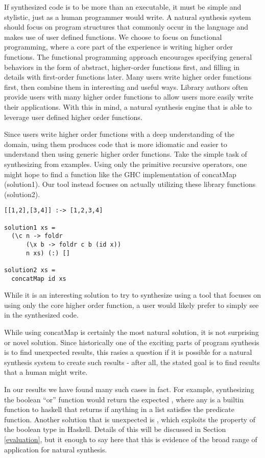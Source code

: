 If synthesized code is to be more than an executable, it must be
simple and stylistic, just as a human programmer would write.  A
natural synthesis system should focus on program structures that
commonly occur in the language and makes use of user defined
functions.  We choose to focus on functional programming, where a core
part of the experience is writing higher order functions.  The
functional programming approach encourages specifying general
behaviors in the form of abstract, higher-order functions first, and
filling in details with first-order functions later.  Many users write
higher order functions first, then combine them in interesting and
useful ways.  Library authors often provide users with many higher
order functions to allow users more easily write their applications.
With this in mind, a natural synthesis engine that is able to leverage
user defined higher order functions.

Since users write higher order functions with a deep understanding of
the domain, using them produces code that is more idiomatic and easier
to understand then using generic higher order functions.  Take the
simple task of synthesizing from examples. Using only the primitive
recursive operators, one might hope to find a function like the
GHC\cite{ghc} implementation of concatMap (solution1). Our tool
instead focuses on actually utilizing these library functions
(solution2).

\begin{lstlisting}
[[1,2],[3,4]] :-> [1,2,3,4]

solution1 xs = 
  (\c n -> foldr 
      (\x b -> foldr c b (id x))
      n xs) (:) []
      
solution2 xs =
  concatMap id xs
\end{lstlisting}
\noindent While it is an interesting solution to try to synthesize
using a tool that focuses on using only the core higher order
function, a user would likely prefer to simply see
 in the synthesized code.

While using concatMap is certainly the most natural solution, it is
not surprising or novel solution.  Since historically one of the
exciting parts of program synthesis is to find unexpected results,
this rasies a question if it is possible for a natural synthesis
system to create such results - after all, the stated goal is to find
results that a human might write.

In our results we have found many such cases in fact. For example,
synthesizing the boolean ``or'' function would return the expected
, where any is a builtin function to haskell that
returns  if anything in a list satisfies the
predicate function. Another solution that is unexpected is
, which exploits the 
property of the boolean type in Haskell. Details of this will be
discussed in Section \ref{evaluation}, but it enough to say here that
this is evidence of the broad range of application for natural
synthesis.


